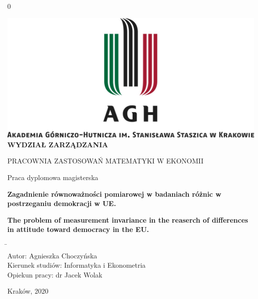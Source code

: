 \documentclass[12pt]{article}
\newcommand{\blind}{0}
\begin{document}
\def\spacingset#1{\renewcommand{\baselinestretch}%
{#1}\small\normalsize} \spacingset{1}



\blind
{
  \begin{center}
  \includegraphics{AGHlogo.jpg}\\[2ex]
    \textbf{\normalsize WYDZIAŁ ZARZĄDZANIA}

  \normalsize{PRACOWNIA ZASTOSOWAŃ MATEMATYKI W EKONOMII}
  \end{center}
\vspace{1cm}
  \begin{center}
    \large{Praca dyplomowa  magisterska}
  \end{center}
\vspace{1cm}
\begin{center}
  \large{\bf Zagadnienie równoważności pomiarowej w badaniach różnic w postrzeganiu demokracji w UE.}

  \large{\bf The problem of measurement invariance in the reaserch of differences in attitude toward democracy in the EU.
}
\end{center}
\bigskip
\vspace{2cm}
\begin{tabbing}
\hspace{5cm} \= \hspace{5cm} \\
Autor:	 \> Agnieszka Choczyńska \\
Kierunek studiów: \>  Informatyka i Ekonometria \\
Opiekun pracy: \> dr Jacek Wolak \\
\end{tabbing}

\begin{center}
	Kraków, 2020
\end{center}

} \fi
\end{document}
